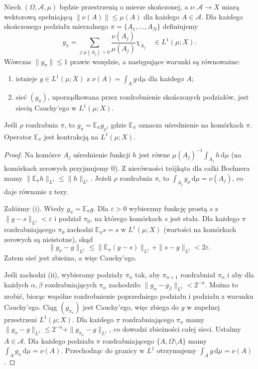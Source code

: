 \begin{lemat}
\label{lem:rnp-partition-30}
Niech $(\Omega,\mathcal A,\mu)$ będzie przestrzenią
o mierze skończonej, a $\nu:\mathcal A\to X$ miarą
wektorową spełniającą $\|\nu(A)\|\le\mu(A)$
dla każdego $A\in\mathcal A$.
Dla każdego skończonego podziału mierzalnego
$\pi=\{A_1,\ldots,A_N\}$ definiujemy
\[
 g_\pi=\sum_{j:\mu(A_j)>0}
 \frac{\nu(A_j)}{\mu(A_j)}\chi_{A_j}
 \quad\in L^1(\mu;X).
\]
Wówczas $\|g_\pi\|\le1$ prawie wszędzie,
a następujące warunki są równoważne:
\begin{enumerate}[label=(\roman*)]
 \item istnieje $g\in L^1(\mu;X)$ z
       $\nu(A)=\int_Ag\,\mathrm d\mu$ dla każdego $A$;
 \item sieć $(g_\pi)$, uporządkowana przez
       rozdrobnienie skończonych podziałów,
       jest siecią Cauchy'ego w $L^1(\mu;X)$.
\end{enumerate}
Jeśli $\rho$ rozdrabnia $\pi$, to
$g_\pi=\mathbb E_\pi g_\rho$, gdzie
$\mathbb E_\pi$ oznacza uśrednienie na komórkach
$\pi$. Operator $\mathbb E_\pi$ jest kontrakcją
na $L^1(\mu;X)$.
\end{lemat}
\begin{proof}
Na komórce $A_j$ uśrednienie funkcji $h$ jest równe
$\mu(A_j)^{-1}\int_{A_j}h\,\mathrm d\mu$
(na komórkach zerowych przyjmujemy $0$).
Z nierówności trójkąta dla całki Bochnera mamy
$\|\mathbb E_\pi h\|_{L^1}\le\|h\|_{L^1}$.
Jeżeli $\rho$ rozdrabnia $\pi$, to
$\int_{A_j}g_\rho\,\mathrm d\mu=\nu(A_j)$,
co daje równanie z tezy.

Załóżmy (i). Wtedy $g_\pi=\mathbb E_\pi g$.
Dla $\varepsilon>0$ wybierzmy funkcję prostą
$s$ z $\|g-s\|_{L^1}<\varepsilon$ i podział
$\pi_0$, na którego komórkach $s$ jest stała.
Dla każdego $\pi$ rozdrabniającego $\pi_0$
zachodzi $\mathbb E_\pi s=s$ w $L^1(\mu;X)$
(wartości na komórkach zerowych są nieistotne), skąd
\[
 \|g_\pi-g\|_{L^1}
 \le\|\mathbb E_\pi(g-s)\|_{L^1}+\|s-g\|_{L^1}
 <2\varepsilon.
\]
Zatem sieć jest zbieżna, a więc Cauchy'ego.

Jeśli zachodzi (ii), wybieramy podziały $\pi_n$
tak, aby $\pi_{n+1}$ rozdrabniał $\pi_n$ i aby
dla każdych $\alpha,\beta$ rozdrabniających $\pi_n$
zachodziło $\|g_\alpha-g_\beta\|_{L^1}<2^{-n}$.
Można to zrobić, biorąc wspólne rozdrobnienie
poprzedniego podziału i podziału z warunku Cauchy'ego.
Ciąg $(g_{\pi_n})$ jest Cauchy'ego, więc zbiega
do $g$ w zupełnej przestrzeni $L^1(\mu;X)$.
Dla każdego $\pi$ rozdrabniającego $\pi_n$ mamy
$\|g_\pi-g\|_{L^1}\le2^{-n}+\|g_{\pi_n}-g\|_{L^1}$,
co dowodzi zbieżności całej sieci. Ustalmy $A\in\mathcal A$.
Dla każdego podziału $\pi$ rozdrabniającego
$\{A,\Omega\setminus A\}$ mamy
$\int_Ag_\pi\,\mathrm d\mu=\nu(A)$.
Przechodząc do granicy w $L^1$ otrzymujemy
$\int_Ag\,\mathrm d\mu=\nu(A)$.
\end{proof}

